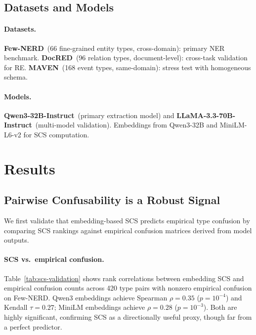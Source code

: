 \documentclass[11pt,a4paper]{article}
\begin{document}
\subsection{Datasets and Models}

\paragraph{Datasets.}
\textbf{Few-NERD}~(66 fine-grained entity types, cross-domain): primary NER benchmark.
\textbf{DocRED}~(96 relation types, document-level): cross-task validation for RE.
\textbf{MAVEN}~(168 event types, same-domain): stress test with homogeneous schema.

\paragraph{Models.}
\textbf{Qwen3-32B-Instruct}~(primary extraction model) and \textbf{LLaMA-3.3-70B-Instruct}~(multi-model validation). Embeddings from Qwen3-32B and MiniLM-L6-v2 for SCS computation.

\section{Results}

\subsection{Pairwise Confusability is a Robust Signal}
\label{sec:confusability}

We first validate that embedding-based SCS predicts empirical type confusion by comparing SCS rankings against empirical confusion matrices derived from model outputs.

\paragraph{SCS vs.\ empirical confusion.}
Table~\ref{tab:scs-validation} shows rank correlations between embedding SCS and empirical confusion counts across 420 type pairs with nonzero empirical confusion on Few-NERD. Qwen3 embeddings achieve Spearman $\rho=0.35$ ($p=10^{-4}$) and Kendall $\tau=0.27$; MiniLM embeddings achieve $\rho=0.28$ ($p=10^{-3}$). Both are highly significant, confirming SCS as a directionally useful proxy, though far from a perfect predictor.
\end{document}
